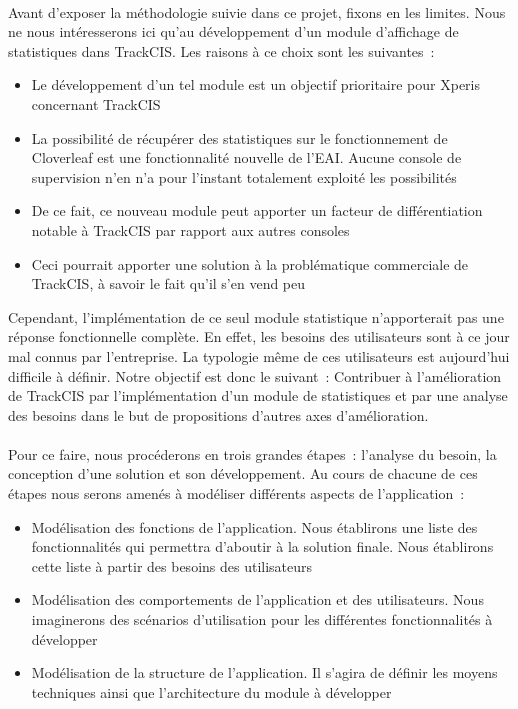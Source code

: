 			\paragraph{}%
			Avant d'exposer la méthodologie suivie dans ce projet, fixons en les limites.
			Nous ne nous intéresserons ici qu'au développement d'un module d'affichage
			de statistiques dans TrackCIS. Les raisons à ce choix sont les suivantes~:
			\begin{itemize}
			  \item Le développement d'un tel module est un objectif prioritaire pour
			  Xperis concernant TrackCIS
			  \item La possibilité de récupérer des statistiques sur le fonctionnement de
			  Cloverleaf est une fonctionnalité nouvelle de l'EAI. Aucune console de
			  supervision n'en n'a pour l'instant totalement exploité les possibilités
			  \item De ce fait, ce nouveau module peut apporter un facteur de
			  différentiation notable à TrackCIS par rapport aux autres consoles
			  \item Ceci pourrait apporter une solution à la problématique commerciale
			  de TrackCIS, à savoir le fait qu'il s'en vend peu
			\end{itemize}
			Cependant, l'implémentation de ce seul module statistique n'apporterait pas
			une réponse fonctionnelle complète. En effet, les besoins des utilisateurs
			sont à ce jour mal connus par l'entreprise. La typologie même de ces
			utilisateurs est aujourd'hui difficile à définir.\newline
			Notre objectif est donc le suivant~:\newline
			Contribuer à l'amélioration de TrackCIS par l'implémentation d'un module de
			statistiques et par une analyse des besoins dans le but de propositions
			d'autres axes d'amélioration.

			\paragraph{}%
			Pour ce faire, nous procéderons en trois grandes étapes~: l'analyse du
			besoin, la conception d'une solution et son développement. Au cours de
			chacune de ces étapes nous serons amenés à modéliser différents aspects de
			l'application~:
			\begin{itemize}
			  \item Modélisation des fonctions de l'application. Nous établirons une
			  liste des fonctionnalités qui permettra d'aboutir à la solution finale.
			  Nous établirons cette liste à partir des besoins des utilisateurs
			  \item Modélisation des comportements de l'application et des utilisateurs.
			  Nous imaginerons des scénarios d'utilisation pour les différentes
			  fonctionnalités à développer
			  \item Modélisation de la structure de l'application. Il s'agira de définir
			  les moyens techniques ainsi que l'architecture du module à développer
			\end{itemize}
			
